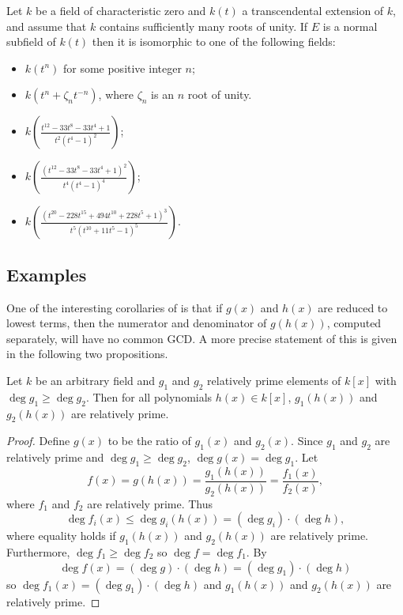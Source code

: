 \begin{proposition}[Klein] \label{Klein:Fields:Prop}
Let $k$ be a field of characteristic zero and $k(t)$ a transcendental
extension of $k$, and assume that $k$ contains sufficiently many roots
of unity.  If $E$ is a normal subfield of $k(t)$ then it is isomorphic
to one of the following fields:
\begin{itemize}
\item $k(t^n)$ for some positive integer $n$;
\item $k(t^n + \zeta_n t^{-n})$, where $\zeta_n$ is an $n$\th{} root
of unity. 
\item $k\left(\frac{t^{12}-33t^8-33t^4+1}{t^2(t^4-1)^2}\right)$;
\item $k\left(\frac{(t^{12}-33t^8-33t^4+1)^2}{t^4(t^4-1)^4}\right)$;
\item $k\left(\frac{(t^{20}-228t^{15}+494t^{10}+228t^5+1)^3}{t^5(t^{10}+11t^5-1)^5}\right)$.
\end{itemize}
\end{proposition}



\subsection{Examples}
\label{Field:Examples:Sec}
One of the interesting corollaries of 
is that if $g(x)$ and $h(x)$ are reduced to lowest terms, then the
numerator and denominator of $g(h(x))$, computed separately, will have
no common GCD.  A more precise statement of this is given in the
following two propositions.

\begin{proposition}
\label{No:GCD:Prop:a}
Let $k$ be an arbitrary field and $g_1$ and $g_2$ relatively prime
elements of $k[x]$ with $\deg g_1 \ge \deg g_2$.  Then for all polynomials
$h(x) \in k[x]$, $g_1(h(x))$ and $g_2(h(x))$ are relatively prime.
\end{proposition}

\begin{proof}
Define $g(x)$ to be the ratio of $g_1(x)$ and $g_2(x)$.  Since $g_1$ and
$g_2$ are relatively prime and $\deg g_1 \ge \deg g_2$, $\deg g(x) = \deg
g_1$.  Let
\[
f(x) = g(h(x)) = \frac{g_1(h(x))}{g_2(h(x))} = \frac{f_1(x)}{f_2(x)},
\]
where $f_1$ and $f_2$ are relatively prime.  Thus
\[
\deg f_i(x) \le \deg g_i(h(x)) = ( \deg g_i) \cdot (\deg h),
\]
where equality holds if $g_1(h(x))$ and $g_2(h(x))$ are relatively prime.
Furthermore, $\deg f_1 \ge \deg f_2$ so $\deg f = \deg f_1$.  By
\[
\deg f(x) = (\deg g) \cdot (\deg h) = (\deg g_1) \cdot (\deg h)
\]
so $\deg f_1(x) = ( \deg g_1) \cdot (\deg h)$ and $g_1(h(x))$ and
$g_2(h(x))$ are relatively prime.
\end{proof}

